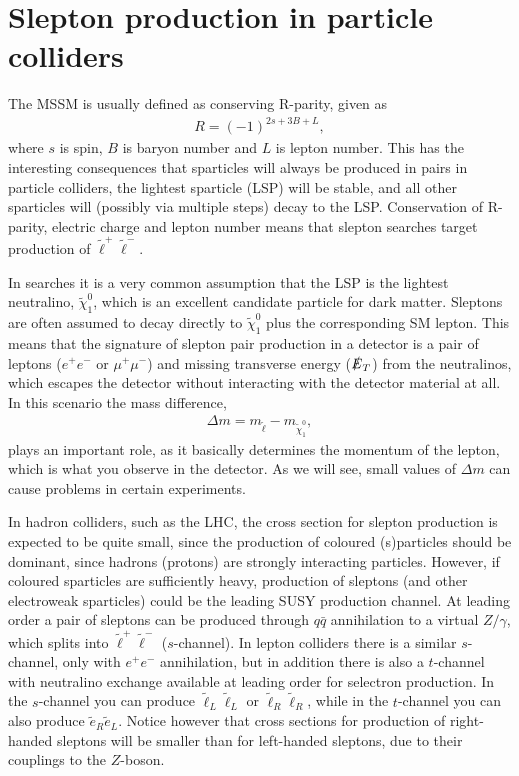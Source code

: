 \documentclass[twocolumn,a4paper,10pt]{article}
\begin{document}
\section{Slepton production in particle colliders}

The MSSM is usually defined as conserving R-parity, given as  
\begin{align*}
R = (-1)^{2s + 3B + L}, 
\end{align*}
where $s$ is spin, $B$ is baryon number and $L$ is lepton number. This has the 
interesting consequences that sparticles will always be produced in pairs in particle colliders, 
the lightest sparticle (LSP) will be stable, and all other sparticles will (possibly via multiple steps) 
decay to the LSP. Conservation of R-parity, electric charge and lepton number means that slepton searches 
target production of $\tilde{\ell}^+\tilde{\ell}^-$. 

In searches it is a very common assumption that 
the LSP is the lightest neutralino, $\tilde{\chi}_1^0$, which is an excellent candidate particle for 
dark matter. Sleptons are often assumed to decay directly to $\tilde{\chi}_1^0$ plus the corresponding SM
lepton. This means that the signature of slepton pair production in a detector is a pair of leptons  
($e^+e^-$ or $\mu^+\mu^-$) and missing transverse energy ($\slashed{E}_T$) from the neutralinos, 
which escapes the detector without interacting with the detector material at all. In this scenario the 
mass difference, 
\begin{align}
\Delta m = m_{\tilde{\ell}} - m_{\tilde{\chi}^0_1}, 
\label{eq:delta m}
\end{align}  
plays an important role, as it basically determines the momentum of the lepton, which is 
what you observe in the detector. As we will see, small values of $\Delta m$ can cause problems in 
certain experiments. 

In hadron colliders, such as the LHC, the cross section for slepton production is expected to be 
quite small, since the production of coloured (s)particles should be dominant, since hadrons (protons) 
are strongly interacting particles. 
However, if coloured sparticles are sufficiently heavy, production of sleptons (and other electroweak 
sparticles) could be the leading SUSY production channel. At leading order a pair of sleptons can be 
produced through $q\bar{q}$ annihilation to a virtual $Z/\gamma$, which splits into 
$\tilde{\ell}^+\tilde{\ell}^-$ ($s$-channel). In lepton colliders there is a similar $s$-channel, only 
with $e^+e^-$ annihilation, but in addition there is also a $t$-channel with neutralino exchange 
available at leading order for selectron production. In the $s$-channel you can produce 
$\tilde{\ell}_L \tilde{\ell}_L$ or $\tilde{\ell}_R \tilde{\ell}_R$, while in the $t$-channel you can 
also produce $\tilde{e}_R\tilde{e}_L$. Notice however that cross sections for production of right-handed 
sleptons will be smaller than for left-handed sleptons, due to their couplings to the $Z$-boson.         
\end{document}
